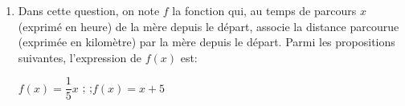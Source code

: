 \begin{enumerate}
\item Dans cette question, on note $f$ la fonction qui, au temps de parcours $x$ (exprimé en heure) de la mère depuis le départ, associe la distance parcourue (exprimée en kilomètre) par la mère depuis le départ.
Parmi les propositions suivantes, l'expression de $f(x)$ est:

\hfill$f(x) = \dfrac{1}{5}x$ \quad{} ;\quad  {} \quad{} ;\quad  $f(x) = x +5$\hfill{}

\end{enumerate}



